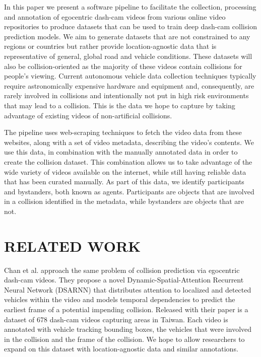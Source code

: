 \documentclass[letterpaper, 10 pt, conference]{IEEEconf}
\begin{document}
In this paper we present a software pipeline to facilitate the collection, processing and annotation of egocentric dash-cam videos from various online video repositories to produce datasets that can be used to train deep dash-cam collision prediction models.
We aim to generate datasets that are not constrained to any regions or countries but rather provide location-agnostic data that is representative of general, global road and vehicle conditions.
These datasets will also be collision-oriented as the majority of these videos contain collisions for people's viewing.
Current autonomous vehicle data collection techniques typically require astronomically expensive hardware and equipment and, consequently, are rarely involved in collisions and intentionally not put in high risk environments that may lead to a collision.
This is the data we hope to capture by taking advantage of existing videos of non-artificial collisions.

The pipeline uses web-scraping techniques to fetch the video data from these websites, along with a set of video metadata, describing the video's contents.
We use this data, in combination with the manually annotated data in order to create the collision dataset.
This combination allows us to take advantage of the wide variety of videos available on the internet, while still having reliable data that has been curated manually.
As part of this data, we identify participants and bystanders, both known as agents. Participants are objects that are involved in a collision identified in the metadata, while bystanders are objects that are not.

\section{RELATED WORK}

Chan et al. \cite{chan2016anticipating} approach the same problem of collision prediction via egocentric dash-cam videos. They propose a novel Dynamic-Spatial-Attention Recurrent Neural Network (DSARNN) that distributes attention to localized and detected vehicles within the video and models temporal dependencies to predict the earliest frame of a potential impending collision. Released with their paper is a dataset of 678 dash-cam videos capturing areas in Taiwan. Each video is annotated with vehicle tracking bounding boxes, the vehicles that were involved in the collision and the frame of the collision. We hope to allow researchers to expand on this dataset with location-agnostic data and similar annotations.
\end{document}
